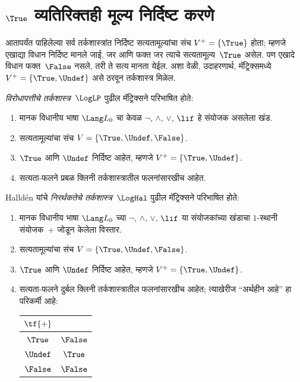 \section[इतर सत्यतामूल्येही निर्दिष्ट करणे]{$\True$ व्यतिरिक्तही मूल्य निर्दिष्ट करणे}\label{mvl:thr:mul:sec}
आतापर्यंत पाहिलेल्या सर्व तर्कशास्त्रांत निर्दिष्ट
सत्यतामूल्यांचा संच $V^+ = \{\True\}$ होता; म्हणजे एखाद्या
विधान निर्दिष्ट मानले जाई, जर आणि फक्त जर त्याचे
सत्यतामूल्य~$\True$ असेल.
पण एखादे विधान फक्त~$\False$ नसले, तरी ते सत्य मानता येईल.
अशा वेळी, उदाहरणार्थ, मॅट्रिक्समध्ये
$V^+ = \{\True, \Undef\}$ असे ठरवून तर्कशास्त्र मिळेल.
\begin{defn}
\emph{विरोधापत्तीचे तर्कशास्त्र}~$\LogLP$ पुढील मॅट्रिक्सने
परिभाषित होते:
\begin{enumerate}
  \item मानक विधानीय भाषा $\Lang L_0$ चा केवळ
  $\lnot$, $\land$, $\lor$, $\lif$ हे संयोजक असलेला खंड.
  \item सत्यतामूल्यांचा संच $V = \{\True, \Undef, \False\}$.
  \item $\True$ आणि $\Undef$ निर्दिष्ट आहेत, म्हणजे $V^+ = \{\True, \Undef\}$.
  \item सत्यता-फलने प्रबळ क्लिनी तर्कशास्त्रातील फलनांसारखीच आहेत.
\end{enumerate}
\end{defn}
\begin{defn}
Halld\'en यांचे \emph{निरर्थकतेचे तर्कशास्त्र}~$\LogHal$
पुढील मॅट्रिक्सने परिभाषित होते:
\begin{enumerate}
  \item मानक विधानीय भाषा $\Lang L_0$ च्या
  $\lnot$, $\land$, $\lor$, $\lif$ या संयोजकांच्या खंडाचा
  $1$-स्थानी संयोजक~$+$ जोडून केलेला विस्तार.
  \item सत्यतामूल्यांचा संच $V = \{\True, \Undef, \False\}$.
  \item $\True$ आणि $\Undef$ निर्दिष्ट आहेत, म्हणजे $V^+ = \{\True, \Undef\}$.
  \item सत्यता-फलने दुर्बल क्लिनी तर्कशास्त्रातील फलनांसारखीच
  आहेत; त्याखेरीज ``अर्थहीन आहे'' हा परिकर्मी आहे:
  \begin{center}
    \begin{tabular}{c|c}
    $\tf{+}$ & \\
    \hline
    $\True$ & $\False$ \\
    $\Undef$ & $\True$ \\
    $\False$ & $\False$
    \end{tabular}
  \end{center}
\end{enumerate}
\end{defn}
